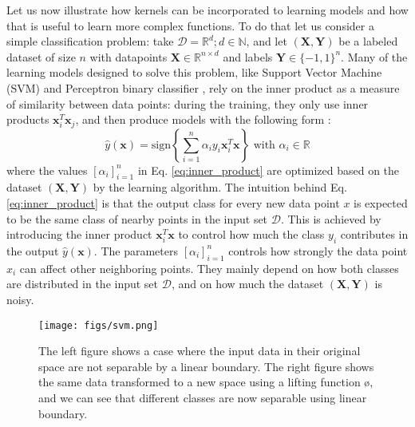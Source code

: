Let us now illustrate how kernels can be incorporated to learning models and how that is useful to learn more complex functions. To do that let us consider a simple classification problem: take $\mathcal{D}=\mathbb{R}^d; d\in\mathbb{N}$, and let $(\mathbf{X},\mathbf{Y})$ be a labeled dataset of size $n$ with datapoints $\mathbf{X}\in \mathbb{R}^{n\times d} $ and labels $\mathbf{Y}\in \{-1,1\}^n$.  Many of the learning models designed to solve this problem, like Support Vector Machine (SVM)  and Perceptron binary classifier , rely on the inner product as a measure of similarity between data points: during the training, they only use inner products $\mathbf{x}_i^T \mathbf{x}_j$, and then produce models with the following form \citep{inner_product}:
\begin{equation}
\label{eq:inner_product}
 \hat{y}(\mathbf{x})=\text{sign}\left\{\sum_{i=1}^n\alpha_iy_i\mathbf{x}_i^T\mathbf{x}\right\} \text{ with } \alpha_i\in \mathbb{R}
\end{equation}
where the values $[\alpha_i]_{i=1}^n$ in Eq. \ref{eq:inner_product} are optimized based on the dataset $(\mathbf{X,Y})$ by the learning algorithm. The intuition behind Eq. \ref{eq:inner_product} is that the output class for every new data point $x$ is expected to be the same class of nearby points in the input set $\mathcal{D}$. This is achieved by introducing the inner product $\mathbf{x}_i^T\mathbf{x}$ to control how much the class $y_i$ contributes in the output $\hat{y}(\mathbf{x})$. The parameters $[\alpha_i]_{i=1}^n$ controls how strongly the data point $x_i$ can affect other neighboring points. They mainly depend on how both classes are distributed in the input set $\mathcal{D}$, and on how much the dataset $(\mathbf{X,Y})$ is noisy. 

\begin{figure}[H]
\centering
\texttt{[image: figs/svm.png]}
\caption[The case where classes aren't separable using linear boundary]{The left figure shows a case where the input data in their original space are not separable by a linear boundary. The right figure shows the same data transformed to a new space using a lifting function \o, and we can see that different classes are now separable  using linear boundary.}
\label{fig:SVM_boundaries}
\end{figure}

